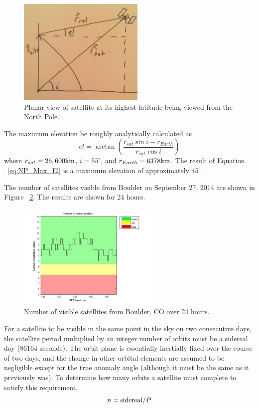 \documentclass[paper]{aiaaNew}
\begin{document}
\begin{figure}[H]
 	\centering
 	\includegraphics[height=2in]{Figures/pole}
 	\caption{Planar view of satellite at its highest latitude being viewed from the North Pole.}
 	\label{fig:Pole}
 \end{figure}

The maximum elevation be roughly analytically calculated as
\begin{equation}\label{eq:NP_Max_El}  
el=\arctan \left ( \frac{r_{sat}\sin i-r_{Earth}}{r_{sat}\cos i} \right )
\end{equation}
where $r_{sat}=26,600\textup{km}$, $i=55^{\circ}$, and $r_{Earth}=6378\textup{km}$.  The result of Equation ~\ref{eq:NP_Max_El} is a maximum elevation of approximately $45^{\circ}$.

The number of satellites visible from Boulder on September 27, 2014 are shown in Figure ~\ref{fig:numVisBoulder}. The results are shown for 24 hours.

\begin{figure}[H]
 	\centering
 	\includegraphics[height=2in]{Figures/num_sats_visible}
 	\caption{Number of visible satellites from Boulder, CO over 24 hours.}
 	\label{fig:numVisBoulder}
 \end{figure}

For a satellite to be visible in the same point in the sky on two consecutive days, the satellite period multiplied by an integer number of orbits must be a sidereal day (86164 seconds)\cite{MisraEnge}.  The orbit plane is essentially inertially fixed over the course of two days, and the change in other orbital elements are assumed to be negligible except for the true anomaly angle (although it must be the same as it previously was).  To determine how many orbits a satellite must complete to satisfy this requirement, 
\begin{equation}\label{eq:NP_Max_El}  
n = \textup{sidereal}/P
\end{equation}
\end{document}
